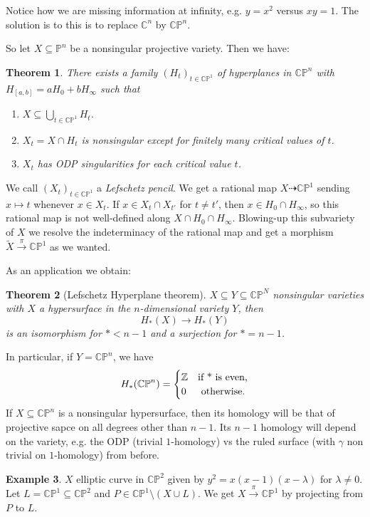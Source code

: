 \documentclass[11pt,A4]{article}
\theoremstyle{plain}
\newtheorem{thm}{Theorem}[section]
\theoremstyle{definition}
\newtheorem{exa}[thm]{Example}
\theoremstyle{remark}
\newcommand{\Z}{\mathbb{Z}}
\newcommand{\1}{\mathbbm{1}}
\newcommand{\C}{\mathbb{C}}
\newcommand{\CP}{\mathbb{CP}}
\begin{document}
Notice how we are missing information at infinity, e.g. $y=x^{2}$ versus $xy=1$.
The solution is to this is to replace $\C^{n}$ by $\CP^{n}$.

So let $X\subseteq\mathbb{P}^{n}$ be a nonsingular projective variety.
Then we have:

\begin{thm}
    There exists a family $(H_{t})_{t\in \CP^{1}}$ of hyperplanes in $\CP^{n}$ with $H_{[a,b]}=aH_{0}+bH_{\infty}$ such that
    \begin{enumerate}
	\item $X\subseteq \bigcup_{t\in \CP^{1}}H_{t}$.
	\item $X_{t}=X\cap H_{t}$ is nonsingular except for finitely many critical values of $t$.
	\item $X_{t}$ has ODP singularities for each critical value $t$.
    \end{enumerate}
\end{thm}

We call $(X_{t})_{t\in \CP^{1}}$ a \textit{Lefschetz pencil}.
We get a rational map $X\dashrightarrow \CP^{1}$ sending $x\mapsto t$ whenever $x\in X_{t}$.
If $x\in X_{t}\cap X_{t'}$ for $t\neq t'$, then $x\in H_{0}\cap H_{\infty}$, so this rational map is not well-defined along $X\cap H_{0}\cap H_{\infty}$.
Blowing-up this subvariety of $X$ we resolve the indeterminacy of the rational map and get a morphism $\tilde{X}\xrightarrow{\pi} \CP^{1}$ as we wanted.

As an application we obtain:

\begin{thm}[Lefschetz Hyperplane theorem]
    $X\subseteq Y\subseteq \CP^{N}$ nonsingular varieties with $X$ a hypersurface in the $n$-dimensional variety $Y$, then
    \[ H_{*}(X)\to H_{*}(Y) \]
    is an isomorphism for $*<n-1$ and a surjection for $*=n-1$.
\end{thm}

In particular, if $Y=\CP^{n}$, we have
\[ H_{*}(\CP^{n})=\begin{cases} \Z & \text{if } $*$ \text{ is even,} \\ 0 & \text{ otherwise.} \end{cases}\]
If $X\subseteq \CP^{n}$ is a nonsingular hypersurface, then its homology will be that of projective sapce on all degrees other than $n-1$.
Its $n-1$ homology will depend on the variety, e.g. the ODP (trivial $1$-homology) vs the ruled surface (with $\gamma$ non trivial on $1$-homology) from before.

\begin{exa}
    $X$ elliptic curve in $\CP^{2}$ given by $y^{2}=x(x-1)(x-\lambda)$ for $\lambda\neq 0$.
    Let $L=\CP^{1}\subseteq \CP^{2}$ and $P\in \CP^{1}\setminus (X\cup L)$.
    We get $X\xrightarrow{\pi}\CP^{1}$ by projecting from $P$ to $L$.
\end{exa}
\end{document}
